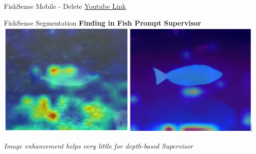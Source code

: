 \begin{frame}{FishSense Mobile - Delete}
    \centering
    \href{https://www.youtube.com/shorts/Q-dP97_H-QA}{Youtube Link}
\end{frame}


\begin{frame}{FishSense Segmentation}
    \centering
    \textbf{Finding in Fish Prompt Supervisor}
    \vspace{0.3cm} %
    \includegraphics[width=\textwidth]{images/fs_depth_3.png}
    \vspace{0.3cm} %

    \textit{Image enhancement helps very little for depth-based Supervisor}
\end{frame}

